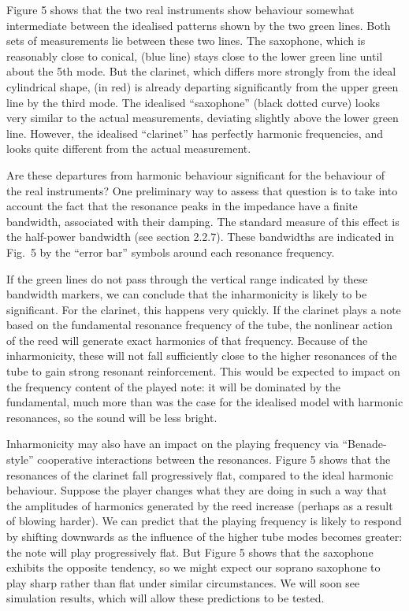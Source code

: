   Figure 5 shows that the two real instruments show behaviour somewhat 
  intermediate between the idealised patterns shown by the two green lines. 
  Both sets of measurements lie between these two lines. The saxophone, which 
  is reasonably close to conical, (blue line) stays close to the lower green 
  line until about the 5th mode. But the clarinet, which differs more strongly 
  from the ideal cylindrical shape, (in red) is already departing significantly 
  from the upper green line by the third mode. The idealised ``saxophone'' 
  (black dotted curve) looks very similar to the actual measurements, deviating 
  slightly above the lower green line. However, the idealised ``clarinet'' has 
  perfectly harmonic frequencies, and looks quite different from the actual 
  measurement. 

  Are these departures from harmonic behaviour significant for the behaviour of 
  the real instruments? One preliminary way to assess that question is to take 
  into account the fact that the resonance peaks in the impedance have a finite 
  bandwidth, associated with their damping. The standard measure of this effect 
  is the half-power bandwidth (see section 2.2.7). These bandwidths are 
  indicated in Fig.\ 5 by the “error bar” symbols around each resonance 
  frequency. 

  If the green lines do not pass through the vertical range indicated by these 
  bandwidth markers, we can conclude that the inharmonicity is likely to be 
  significant. For the clarinet, this happens very quickly. If the clarinet 
  plays a note based on the fundamental resonance frequency of the tube, the 
  nonlinear action of the reed will generate exact harmonics of that frequency. 
  Because of the inharmonicity, these will not fall sufficiently close to the 
  higher resonances of the tube to gain strong resonant reinforcement. This 
  would be expected to impact on the frequency content of the played note: it 
  will be dominated by the fundamental, much more than was the case for the 
  idealised model with harmonic resonances, so the sound will be less bright. 

  Inharmonicity may also have an impact on the playing frequency via 
  “Benade-style” cooperative interactions between the resonances. Figure 5 
  shows that the resonances of the clarinet fall progressively flat, compared 
  to the ideal harmonic behaviour. Suppose the player changes what they are 
  doing in such a way that the amplitudes of harmonics generated by the reed 
  increase (perhaps as a result of blowing harder). We can predict that the 
  playing frequency is likely to respond by shifting downwards as the influence 
  of the higher tube modes becomes greater: the note will play progressively 
  flat. But Figure 5 shows that the saxophone exhibits the opposite tendency, 
  so we might expect our soprano saxophone to play sharp rather than flat under 
  similar circumstances. We will soon see simulation results, which will allow 
  these predictions to be tested. 

